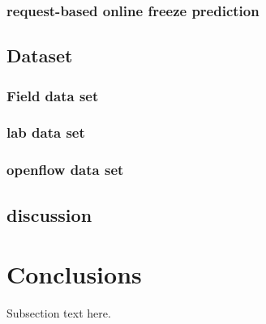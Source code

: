 \documentclass[journal]{IEEEtran}
\begin{document}
		\subsubsection{request-based online freeze prediction}

\subsection{Dataset}
\subsubsection{Field data set}
\label{subsubsec:field_data_set}

\subsubsection{lab data set}
\subsubsection{openflow data set}
\subsection{discussion}

\section{Conclusions}
\label{sec:conclusions}
Subsection text here.






%
\end{document}
